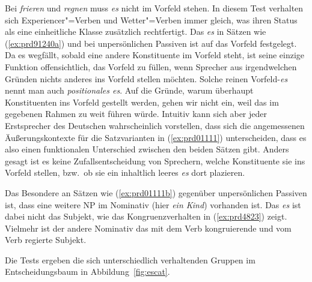 Bei \textit{frieren} und \textit{regnen} muss \textit{es} nicht im Vorfeld stehen.
In diesem Test verhalten sich Experiencer"=Verben und Wetter"=Verben immer gleich, was ihren Status als eine einheitliche Klasse zusätzlich rechtfertigt.
Das \textit{es} in Sätzen wie (\ref{ex:prd91240a}) und bei unpersönlichen Passiven ist auf das Vorfeld festgelegt.
Da es wegfällt, sobald eine andere Konstituente im Vorfeld steht, ist seine einzige Funktion offensichtlich, das Vorfeld zu füllen, wenn Sprecher aus irgendwelchen Gründen nichts anderes ins Vorfeld stellen möchten.
Solche reinen Vorfeld-\textit{es} nennt man auch \textit{positionales es}.
Auf die Gründe, warum überhaupt Konstituenten ins Vorfeld gestellt werden, gehen wir nicht ein, weil das im gegebenen Rahmen zu weit führen würde.
Intuitiv kann sich aber jeder Erstsprecher des Deutschen wahrscheinlich vorstellen, dass sich die angemessenen Äußerungskontexte für die Satzvarianten in (\ref{ex:prd01111}) unterscheiden, dass es also einen funktionalen Unterschied zwischen den beiden Sätzen gibt.
Anders gesagt ist es keine Zufallsentscheidung von Sprechern, welche Konstituente sie ins Vorfeld stellen, bzw.\ ob sie ein inhaltlich leeres \textit{es} dort plazieren.

\begin{exe}
  \ex\label{ex:prd01111} 
  \begin{xlist}
  \end{xlist}
\end{exe}

Das Besondere an Sätzen wie (\ref{ex:prd01111b}) gegenüber unpersönlichen Passiven ist, dass eine weitere NP im Nominativ (hier \textit{ein Kind}) vorhanden ist.
Das \textit{es} ist dabei nicht das Subjekt, wie das Kongruenzverhalten in (\ref{ex:prd4823}) zeigt.
Vielmehr ist der andere Nominativ das mit dem Verb kongruierende und vom Verb regierte Subjekt.

\begin{exe}
  \ex\label{ex:prd4823}
  \begin{xlist}
  \end{xlist}
\end{exe}

Die Tests ergeben die sich unterschiedlich verhaltenden Gruppen im Entscheidungsbaum in Abbildung~\ref{fig:escat}.

